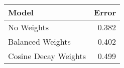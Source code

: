\begin{tabular}{lr}
\toprule
Model & Error \\
\midrule
No Weights & 0.382 \\
Balanced Weights & 0.402 \\
Cosine Decay Weights & 0.499 \\
\bottomrule
\end{tabular}
